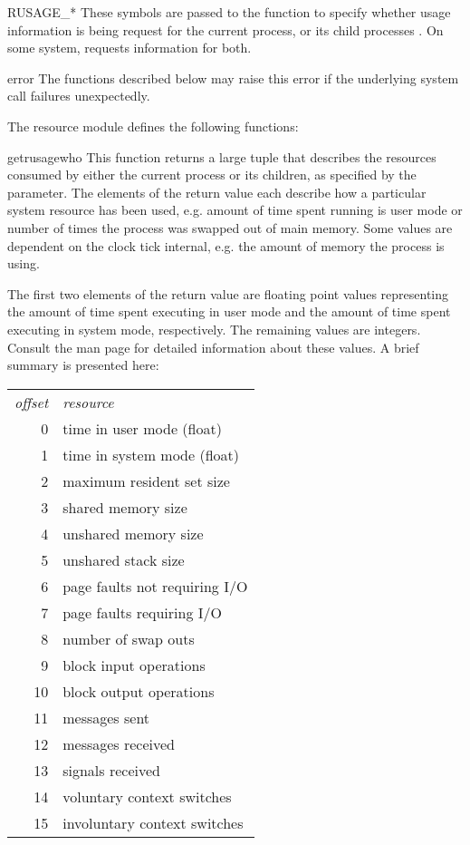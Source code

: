 \begin{datadesc}{RUSAGE_*}
  These symbols are passed to the  function to specify
  whether usage information is being request for the current process,
   or its child processes . On
  some system,  requests information for both.
\end{datadesc}

\begin{datadesc}{error}
  The functions described below may raise this error if the underlying
  system call failures unexpectedly.
\end{datadesc}

The resource module defines the following functions:

\begin{funcdesc}{getrusage}{who}
  This function returns a large tuple that describes the resources
  consumed by either the current process or its children, as specified
  by the  parameter. The elements of the return value each
  describe how a particular system resource has been used, e.g. amount
  of time spent running is user mode or number of times the process was
  swapped out of main memory. Some values are dependent on the clock
  tick internal, e.g. the amount of memory the process is using.

  The first two elements of the return value are floating point values
  representing the amount of time spent executing in user mode and the
  amount of time spent executing in system mode, respectively. The
  remaining values are integers. Consult the  man page
  for detailed information about these values. A brief summary is
  presented here:

\begin{tabular}{rl}
	\emph{offset} &	\emph{resource} \\
	0  &	time in user mode (float) \\
	1  &	time in system mode (float) \\
	2  &	maximum resident set size \\
	3  &	shared memory size \\
	4  &	unshared memory size \\
	5  &	unshared stack size \\
	6  &	page faults not requiring I/O \\
	7  &	page faults requiring I/O \\
	8  &	number of swap outs \\
	9  &	block input operations \\
	10 &	block output operations \\
	11 &	messages sent \\
	12 &	messages received \\
	13 &	signals received \\
	14 &	voluntary context switches \\
	15 &	involuntary context switches \\
\end{tabular}


\end{funcdesc}
